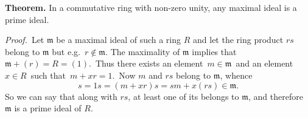 \documentclass[12pt]{article}
\theoremstyle{definition}
\begin{document}
\textbf{Theorem.}  In a commutative ring with non-zero unity, any maximal ideal is a prime ideal.

{\em Proof.}\, Let $\mathfrak{m}$ be a maximal ideal of such a ring $R$ and let the ring product $rs$ belong to $\mathfrak{m}$ but e.g. \,$r \notin \mathfrak{m}$.  The maximality of $\mathfrak{m}$ implies that\, 
$\mathfrak{m}\!+\!(r) = R = (1)$.\, Thus there exists an element \,$m \in \mathfrak{m}$\, and an element\, $x \in R$\, such that\, $m\!+\!xr = 1$.\, Now $m$ and $rs$ belong to $\mathfrak{m}$, whence
       $$s = 1s = (m\!+\!xr)s = sm\!+\!x(rs) \in \mathfrak{m}.$$ 
So we can say that along with $rs$, at least one of its  belongs to $\mathfrak{m}$, and therefore $\mathfrak{m}$ is a prime ideal of $R$.
\end{document}
